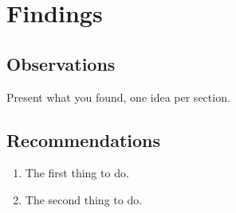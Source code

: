 \chapter{Findings}
\label{ch:findings}

\section{Observations}
Present what you found, one idea per section.

\section{Recommendations}
\begin{enumerate}
  \item The first thing to do.
  \item The second thing to do.
\end{enumerate}
